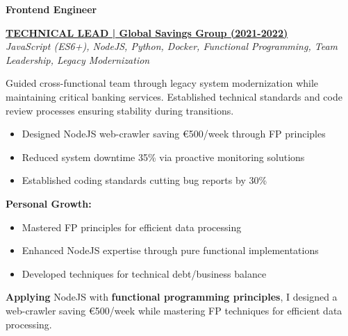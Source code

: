 \documentclass[a4paper,10pt]{article}
\begin{document}
\vspace{0.5cm}
\noindent
\begin{minipage}{\textwidth}
	{\large\bfseries\color{darkblue}\selectfont Frontend Engineer}
	\vspace{0.3cm}

    \noindent\uline{\textbf{TECHNICAL LEAD | Global Savings Group (2021-2022)}} \\
	\vspace{0.1cm}
	{\small\textit{JavaScript (ES6+), NodeJS, Python, Docker, Functional Programming, Team Leadership, Legacy Modernization}}
	\vspace{0.2cm}

	Guided cross-functional team through legacy system modernization while maintaining critical banking services. Established technical standards and code review processes ensuring stability during transitions.

	\vspace{0.2cm}
	\begin{itemize}[label=\textcolor{darkblue}{\textbullet}, leftmargin=*, nosep]
		\item Designed NodeJS web-crawler saving €500/week through FP principles
		\item Reduced system downtime 35\% via proactive monitoring solutions
		\item Established coding standards cutting bug reports by 30\%
	\end{itemize}

	\vspace{0.2cm}
	\textbf{Personal Growth:}
	\vspace{0.2cm}
	\begin{itemize}[label=\textcolor{darkblue}{\textbullet}, leftmargin=*, nosep]
		\item Mastered FP principles for efficient data processing
		\item Enhanced NodeJS expertise through pure functional implementations
		\item Developed techniques for technical debt/business balance
	\end{itemize}

    \vspace{0.4cm}

    \textbf{Applying} NodeJS with \textbf{functional programming principles}, I designed a web-crawler saving €500/week while mastering FP techniques for efficient data processing.


\end{minipage}
\end{document}
